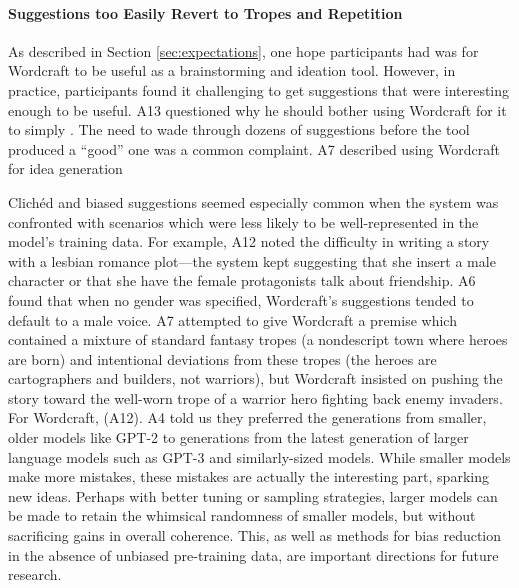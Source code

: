 \paragraph{Suggestions too Easily Revert to Tropes and Repetition}
As described in Section \ref{sec:expectations}, one hope participants had was for Wordcraft to be useful as a brainstorming and ideation tool.
However, in practice, participants found it challenging to get suggestions that were interesting enough to be useful.
A13 questioned why he should bother using Wordcraft for it to simply .
The need to wade through dozens of suggestions before the tool produced a ``good'' one was a common complaint.
A7 described using Wordcraft for idea generation 

Clichéd and biased suggestions seemed especially common when the system was confronted with scenarios which were less likely to be well-represented in the model's training data.
For example, A12 noted the difficulty in writing a story with a lesbian romance plot---the system kept suggesting that she insert a male character or that she have the female protagonists talk about friendship.
A6 found that when no gender was specified, Wordcraft's suggestions tended to default to a male voice.
A7 attempted to give Wordcraft a premise which contained a mixture of standard fantasy tropes (a nondescript town where heroes are born) and intentional deviations from these tropes (the heroes are cartographers and builders, not warriors), but Wordcraft insisted on pushing the story toward the well-worn trope of a warrior hero fighting back enemy invaders.
For Wordcraft,  (A12).
A4 told us they preferred the generations from smaller, older models like GPT-2 to generations from the latest generation of larger language models such as GPT-3 and similarly-sized models.
While smaller models make more mistakes, these mistakes are actually the interesting part, sparking new ideas.
Perhaps with better tuning or sampling strategies, larger models can be made to retain the whimsical randomness of smaller models, but without sacrificing gains in overall coherence.
This, as well as methods for bias reduction in the absence of unbiased pre-training data, are important directions for future research.

